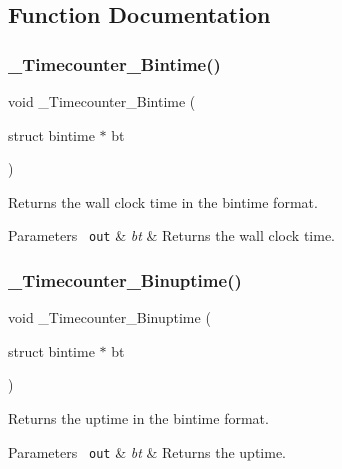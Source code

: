 \subsection{Function Documentation}
\mbox{\label{group__RTEMSScoreTimecounter_ga988aedc781dc73e89a481adb99455d21}} 
\subsubsection{\texorpdfstring{\_Timecounter\_Bintime()}{\_Timecounter\_Bintime()}}
{\footnotesize\ttfamily void \+\_\+\+Timecounter\+\_\+\+Bintime (\begin{DoxyParamCaption}\item[{struct bintime $\ast$}]{bt }\end{DoxyParamCaption})}



Returns the wall clock time in the bintime format. 


\begin{DoxyParams}[1]{Parameters}
\mbox{\texttt{ out}}  & {\em bt} & Returns the wall clock time. \\
\hline
\end{DoxyParams}
\mbox{\label{group__RTEMSScoreTimecounter_ga8c656c32ac30398dedcec9f43163bee4}} 
\subsubsection{\texorpdfstring{\_Timecounter\_Binuptime()}{\_Timecounter\_Binuptime()}}
{\footnotesize\ttfamily void \+\_\+\+Timecounter\+\_\+\+Binuptime (\begin{DoxyParamCaption}\item[{struct bintime $\ast$}]{bt }\end{DoxyParamCaption})}



Returns the uptime in the bintime format. 


\begin{DoxyParams}[1]{Parameters}
\mbox{\texttt{ out}}  & {\em bt} & Returns the uptime. \\
\hline
\end{DoxyParams}
\mbox{\label{group__RTEMSScoreTimecounter_gaad315babe0faa38d8e287b6354e7e1f7}} 
